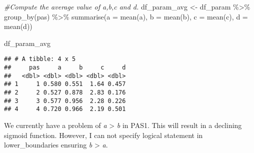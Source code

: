 \documentclass[
]{article}
\newenvironment{Shaded}{\begin{snugshade}}{\end{snugshade}}
\newcommand{\AttributeTok}[1]{\textcolor[rgb]{0.77,0.63,0.00}{#1}}
\newcommand{\CommentTok}[1]{\textcolor[rgb]{0.56,0.35,0.01}{\textit{#1}}}
\newcommand{\FunctionTok}[1]{\textcolor[rgb]{0.00,0.00,0.00}{#1}}
\newcommand{\NormalTok}[1]{#1}
\newcommand{\OtherTok}[1]{\textcolor[rgb]{0.56,0.35,0.01}{#1}}
\newcommand{\SpecialCharTok}[1]{\textcolor[rgb]{0.00,0.00,0.00}{#1}}
\begin{document}
\begin{Shaded}
\begin{Highlighting}[]
\CommentTok{\#Compute the average value of a,b,c and d. }
\NormalTok{df\_param\_avg }\OtherTok{\textless{}{-}}\NormalTok{ df\_param }\SpecialCharTok{\%\textgreater{}\%} 
  \FunctionTok{group\_by}\NormalTok{(pas) }\SpecialCharTok{\%\textgreater{}\%}
  \FunctionTok{summarise}\NormalTok{(}\AttributeTok{a =} \FunctionTok{mean}\NormalTok{(a), }\AttributeTok{b =} \FunctionTok{mean}\NormalTok{(b), }\AttributeTok{c =} \FunctionTok{mean}\NormalTok{(c), }\AttributeTok{d =} \FunctionTok{mean}\NormalTok{(d))}

\NormalTok{df\_param\_avg}
\end{Highlighting}
\end{Shaded}

\begin{verbatim}
## # A tibble: 4 x 5
##     pas     a     b     c     d
##   <dbl> <dbl> <dbl> <dbl> <dbl>
## 1     1 0.580 0.551  1.64 0.457
## 2     2 0.527 0.878  2.83 0.176
## 3     3 0.577 0.956  2.28 0.226
## 4     4 0.720 0.966  2.19 0.501
\end{verbatim}

We currently have a problem of \emph{a} \textgreater{} \emph{b} in PAS1.
This will result in a declining sigmoid function. However, I can not
specify logical statement in lower\_boundaries ensuring \emph{b}
\textgreater{} \emph{a}.
\end{document}
